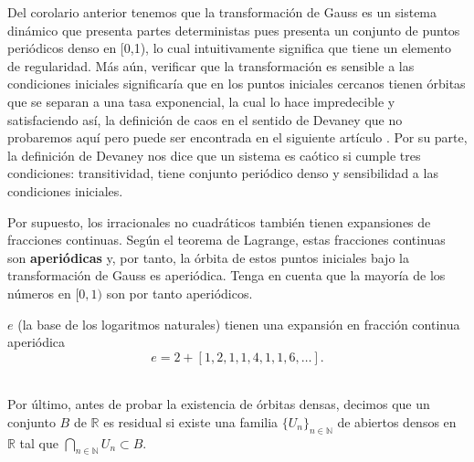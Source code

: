 Del corolario anterior tenemos que la transformación de Gauss es un sistema dinámico que presenta partes deterministas pues presenta un conjunto de puntos periódicos denso en [0,1), lo cual intuitivamente significa que tiene un elemento de regularidad. Más aún, verificar que la transformación es sensible a las condiciones iniciales significaría que en los puntos iniciales cercanos tienen órbitas que se separan a una tasa exponencial, la cual lo hace impredecible y satisfaciendo así, la definición de caos en el sentido de Devaney \cite{Devaney1989} que no probaremos aquí pero puede ser encontrada en el siguiente artículo \cite{chaos}. Por su parte, la definición de Devaney nos dice que un sistema es caótico si cumple tres condiciones: transitividad, tiene conjunto periódico denso y sensibilidad a las condiciones iniciales. 

\begin{obs}
Por supuesto, los irracionales no cuadráticos también tienen expansiones de fracciones continuas. Según el teorema de Lagrange, estas fracciones continuas son \textbf{aperiódicas} y, por tanto, la órbita de estos puntos iniciales bajo la transformación de Gauss es aperiódica. Tenga en cuenta que la mayoría de los números en $[0,1)$ son por tanto aperiódicos.
\end{obs}

\begin{ejem}
$e$ (la base de los logaritmos naturales) tienen una expansión en fracción continua aperiódica 
$$
e=2+[1,2,1,1,4,1,1,6,\ldots]. 
$$
\end{ejem}
\\

Por último, antes de probar la existencia de órbitas densas, decimos que un conjunto $B$ de $\mathbb{R}$ es residual si existe una familia $\{U_{n}\}_{n\in\mathbb{N}}$ de abiertos densos en $\mathbb{R}$ tal que $\displaystyle\bigcap_{n\in\mathbb{N}}U_{n}\subset B$. 
\\

